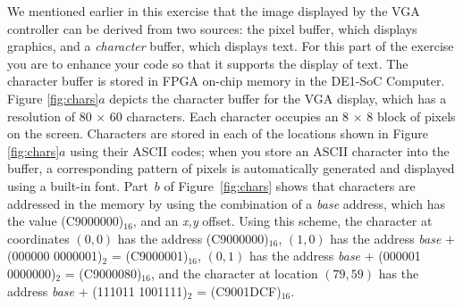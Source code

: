 \documentclass[epsfig,10pt,fullpage]{article}
\begin{document}
\noindent
We mentioned earlier in this exercise that the image displayed by the VGA
controller can be derived from two sources: the pixel buffer, which displays graphics, 
and a {\it character} buffer, which displays text. For this part of the exercise you 
are to enhance your code so that it supports the display of text. The character buffer 
is stored in FPGA on-chip memory in the DE1-SoC Computer. Figure \ref{fig:chars}$a$ 
depicts the character buffer for the VGA
display, which has a resolution of 80 $\times$ 60 characters. Each character occupies an
8 $\times$ 8 block of pixels on the screen. Characters are stored in each of the locations
shown in Figure \ref{fig:chars}$a$ using their ASCII codes; when you store an ASCII character into
the buffer, a corresponding pattern of pixels is automatically generated and displayed using 
a built-in font. Part~$b$ of Figure~\ref{fig:chars} shows
that characters are addressed in the memory by using the combination of a {\it base} address,
which has the value (C9000000)$_{16}$, and an {\it x,y} offset. Using this scheme, the
character at coordinates $(0,0)$ has the address (C9000000)$_{16}$, 
$(1,0)$ has the address {\it base} $+$ (000000 0000001)$_2$ = (C9000001)$_{16}$, 
$(0,1)$ has the address {\it base} $+$ (000001 0000000)$_2$ = (C9000080)$_{16}$, and 
the character at location $(79,59)$ has the address {\it base} $+$ (111011 1001111)$_2$ = 
(C9001DCF)$_{16}$. 
\end{document}
